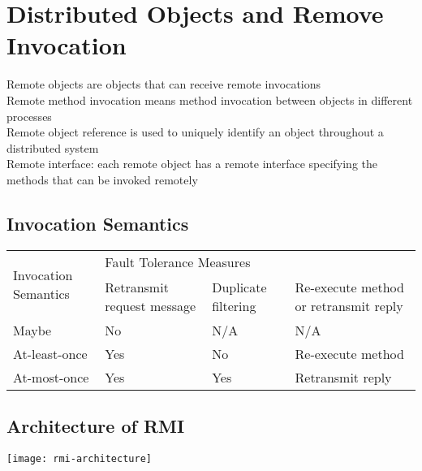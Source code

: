 \chapter{Distributed Objects and Remove Invocation}
\begin{multicols*}{2}

\noindent Remote objects are objects that can receive remote invocations\\

\noindent Remote method invocation means method invocation between objects in different processes\\

\noindent Remote object reference is used to uniquely identify an object throughout a distributed system\\

\noindent Remote interface: each remote object has a remote interface specifying the methods that can be invoked remotely

\section{Invocation Semantics}

\scriptsize
\begin{center}
\begin{tabular}{ |m{2cm}|p{1.7cm}|p{1.7cm}|p{1.7cm}| } 
    \hline
    \multirow{2}{2cm}{\begin{center}Invocation Semantics\end{center}} & \multicolumn{3}{p{5.1cm}|}{Fault Tolerance Measures} \\ \cline{2-4}
    & Retransmit request message & Duplicate filtering & Re-execute method or retransmit reply \\
    \hline
    Maybe\newline  & No  & N/A & N/A \\
    \hline
    At-least-once  & Yes & No  & Re-execute method \\
    \hline
    At-most-once   & Yes & Yes & Retransmit reply \\
    \hline
\end{tabular}
\end{center}
\normalsize

\section{Architecture of RMI}

\begin{center}
\texttt{[image: rmi-architecture]}
\end{center}


\end{multicols*}
